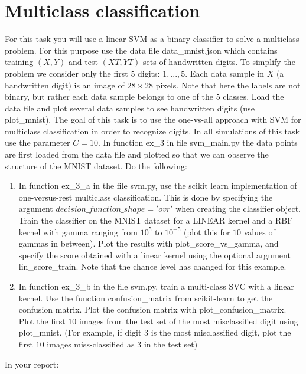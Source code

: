 \documentclass[a4paper]{article}
\begin{document}
\section{Multiclass classification}
For this task you will use a linear SVM as a binary classifier to solve a multiclass problem. For this purpose use the data file data\_mnist.json which contains training $(X, Y )$ and test $(XT, Y T)$ sets of handwritten digits. To simplify the problem we consider only the first $5$ digits: $1, . . . , 5$. Each data sample in $X$ (a handwritten digit) is an image of $28 \times 28$ pixels. Note that here the labels are not binary, but rather each data sample belongs to one of the $5$ classes. Load the data file and plot several data samples to see handwritten digits (use plot\_mnist). The goal of this task is to use the one-vs-all approach with SVM for multiclass classification in order to recognize digits. In all simulations of this task use the parameter $C = 10$. 
In function ex\_3 in file svm\_main.py the data points are first loaded from the data file and plotted so that we can observe the structure of the MNIST dataset. Do the following:
\begin{enumerate}[label=(\alph*)]
\item In function ex\_3\_a in the file svm.py, use the scikit learn implementation of one-versus-rest multiclass classification. This is done by specifying the argument $decision\_function\_shape='ovr'$ when creating the classifier object. Train the classifier on the MNIST dataset for a LINEAR kernel and a RBF kernel with gamma ranging from $10^5$ to $10^{−5}$ (plot this for $10$ values of gammas in between). Plot the results with plot\_score\_vs\_gamma, and specify the score obtained with a linear kernel using the optional argument lin\_score\_train. Note that the chance level has changed for this example.
\item In function ex\_3\_b in the file svm.py, train a multi-class SVC with a linear kernel. Use the function confusion\_matrix from scikit-learn to get the confusion matrix. Plot the confusion matrix with plot\_confusion\_matrix. Plot the first $10$ images from the test set of the most misclassified digit using plot\_mnist. (For example, if digit 3 is the most misclassified digit, plot the first $10$ images miss-classified as 3 in the test set)

\end{enumerate}
In your report:
\end{document}
